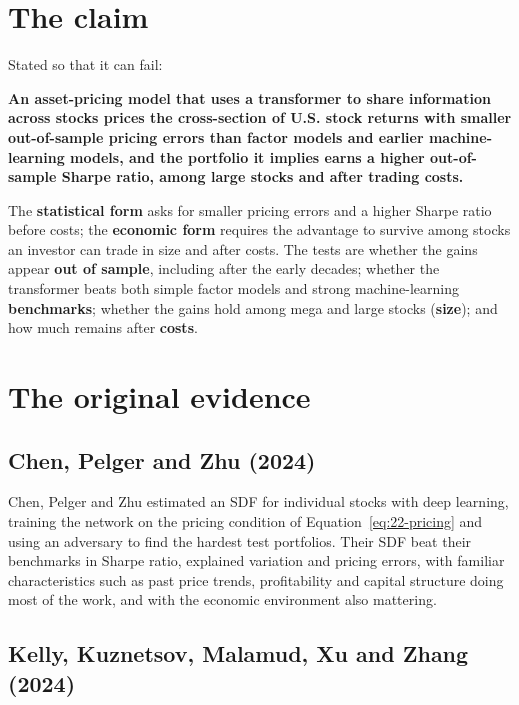 \section{The claim}
\label{sec:22-claim}

Stated so that it can fail:

\begin{callout}
\textbf{An asset-pricing model that uses a transformer to share information across stocks prices the cross-section of U.S. stock returns with smaller out-of-sample pricing errors than factor models and earlier machine-learning models, and the portfolio it implies earns a higher out-of-sample Sharpe ratio, among large stocks and after trading costs.}
\end{callout}

The \textbf{statistical form} asks for smaller pricing errors and a higher Sharpe ratio before costs; the \textbf{economic form} requires the advantage to survive among stocks an investor can trade in size and after costs. The tests are whether the gains appear \textbf{out of sample}, including after the early decades; whether the transformer beats both simple factor models and strong machine-learning \textbf{benchmarks}; whether the gains hold among mega and large stocks (\textbf{size}); and how much remains after \textbf{costs}.

\section{The original evidence}
\label{sec:22-evidence}

\subsection{Chen, Pelger and Zhu (2024)}

Chen, Pelger and Zhu estimated an SDF for individual stocks with deep learning, training the network on the pricing condition of Equation~\eqref{eq:22-pricing} and using an adversary to find the hardest test portfolios. Their SDF beat their benchmarks in Sharpe ratio, explained variation and pricing errors, with familiar characteristics such as past price trends, profitability and capital structure doing most of the work, and with the economic environment also mattering.

\subsection{Kelly, Kuznetsov, Malamud, Xu and Zhang (2024)}


